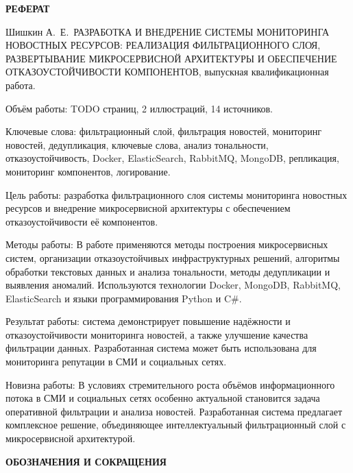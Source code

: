 \newpage
{\centering
\normal
\textbf{РЕФЕРАТ}\par
}

Шишкин А.\ Е.\ РАЗРАБОТКА И ВНЕДРЕНИЕ СИСТЕМЫ МОНИТОРИНГА НОВОСТНЫХ РЕСУРСОВ: РЕАЛИЗАЦИЯ ФИЛЬТРАЦИОННОГО СЛОЯ, РАЗВЕРТЫВАНИЕ МИКРОСЕРВИСНОЙ АРХИТЕКТУРЫ И ОБЕСПЕЧЕНИЕ ОТКАЗОУСТОЙЧИВОСТИ КОМПОНЕНТОВ, выпускная квалификационная работа.

Объём работы: {TODO} страниц, 2 иллюстраций, 14 источников.

Ключевые слова: фильтрационный слой, фильтрация новостей, мониторинг новостей, дедупликация, ключевые слова, анализ тональности, отказоустойчивость, Docker, ElasticSearch, RabbitMQ, MongoDB, репликация, мониторинг компонентов, логирование.

Цель работы: разработка фильтрационного слоя системы мониторинга новостных ресурсов и внедрение микросервисной архитектуры с обеспечением отказоустойчивости её компонентов.

Методы работы: В работе применяются методы построения микросервисных систем, организации отказоустойчивых инфраструктурных решений, алгоритмы обработки текстовых данных и анализа тональности, методы дедупликации и выявления аномалий.
Используются технологии Docker, MongoDB, RabbitMQ, ElasticSearch и языки программирования Python и C\#.

Результат работы: система демонстрирует повышение надёжности и отказоустойчивости мониторинга новостей, а также улучшение качества фильтрации данных.
Разработанная система может быть использована для мониторинга репутации в СМИ и социальных сетях.

Новизна работы: В условиях стремительного роста объёмов информационного потока в СМИ и социальных сетях особенно актуальной становится задача оперативной фильтрации и анализа новостей.
Разработанная система предлагает комплексное решение, объединяющее интеллектуальный фильтрационный слой с микросервисной архитектурой.

\setcounter{page}{2}

\newpage
\renewcommand{\contentsname}{\centerline{\normal СОДЕРЖАНИЕ}}
\begin{spacing}{1.5}
\tableofcontents
\end{spacing}

\newpage
{\centering
\normal
\textbf{ОБОЗНАЧЕНИЯ И СОКРАЩЕНИЯ}\par
}


